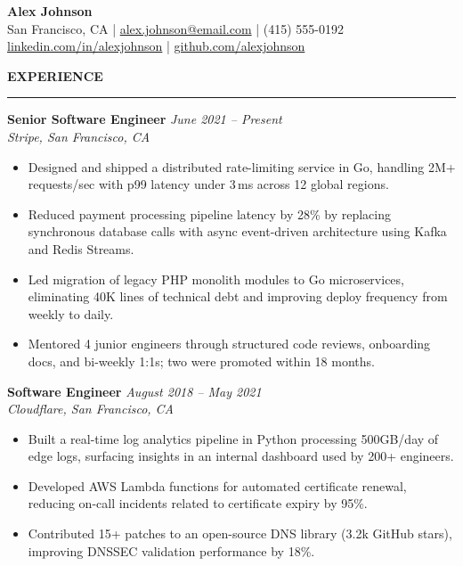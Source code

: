 \documentclass[11pt,a4paper]{article}
\newcommand{\sectionrule}{%
  \vspace{-4pt}\rule{\textwidth}{0.4pt}\vspace{2pt}%
}
\begin{document}
\begin{center}
  {\LARGE \textbf{Alex Johnson}}\\[4pt]
  San Francisco, CA \quad|\quad
  \href{mailto:alex.johnson@email.com}{alex.johnson@email.com} \quad|\quad
  (415) 555-0192\\[2pt]
  \href{https://linkedin.com/in/alexjohnson}{linkedin.com/in/alexjohnson} \quad|\quad
  \href{https://github.com/alexjohnson}{github.com/alexjohnson}
\end{center}

\vspace{2pt}

\noindent\textbf{\large EXPERIENCE}\\
\sectionrule

\noindent\textbf{Senior Software Engineer} \hfill \textit{June 2021 -- Present}\\
\textit{Stripe, San Francisco, CA}
\begin{itemize}
  \item Designed and shipped a distributed rate-limiting service in Go, handling 2M+ requests/sec with p99 latency under 3\,ms across 12 global regions.
  \item Reduced payment processing pipeline latency by 28\% by replacing synchronous database calls with async event-driven architecture using Kafka and Redis Streams.
  \item Led migration of legacy PHP monolith modules to Go microservices, eliminating 40K lines of technical debt and improving deploy frequency from weekly to daily.
  \item Mentored 4 junior engineers through structured code reviews, onboarding docs, and bi-weekly 1:1s; two were promoted within 18 months.
\end{itemize}

\vspace{6pt}
\noindent\textbf{Software Engineer} \hfill \textit{August 2018 -- May 2021}\\
\textit{Cloudflare, San Francisco, CA}
\begin{itemize}
  \item Built a real-time log analytics pipeline in Python processing 500GB/day of edge logs, surfacing insights in an internal dashboard used by 200+ engineers.
  \item Developed AWS Lambda functions for automated certificate renewal, reducing on-call incidents related to certificate expiry by 95\%.
  \item Contributed 15+ patches to an open-source DNS library (3.2k GitHub stars), improving DNSSEC validation performance by 18\%.
\end{itemize}
\end{document}
